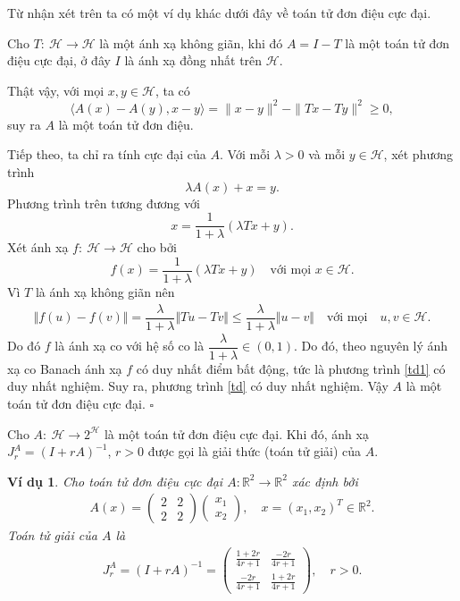 \documentclass[14pt, oneside,A4paper]{book}
\theoremstyle{plain}
\newcommand{\eproof}{\hfill $\square$}
\newtheorem{vd}[theorem]{\bf Ví dụ}
\begin{document}
Từ nhận xét trên ta có một ví dụ khác dưới đây về toán tử đơn điệu cực đại.

\vd\rm Cho $T:\ \mathcal H\longrightarrow \mathcal H$ là một ánh xạ không giãn, khi đó $A=I-T$ là một toán tử đơn điệu cực đại, ở đây $I$ là ánh xạ đồng nhất trên $\mathcal H$.

Thật vậy, với mọi $x,y\in \mathcal H$, ta có
$$\langle A(x)-A(y), x-y\rangle =\|x-y\|^2-\|Tx-Ty\|^2\geq 0,$$
suy ra $A$ là một toán tử đơn điệu.

Tiếp theo, ta chỉ ra tính cực đại của $A$. Với mỗi $\lambda >0$ và mỗi $y\in \mathcal H$, xét phương trình 
\begin{equation}\label{td}
\lambda A(x) +x=y.
\end{equation}
Phương trình trên tương đương với
\begin{equation}\label{td1}
x=\dfrac{1}{1+\lambda} (\lambda Tx+y).
\end{equation}
Xét ánh xạ $f:\ \mathcal H\longrightarrow \mathcal H$ cho bởi
$$f(x)=\dfrac{1}{1+\lambda} (\lambda Tx+y)\quad \text{với mọi $x\in \mathcal H$.}$$
Vì $T$ là ánh xạ không giãn nên
\begin{align*}
\Vert f(u)-f(v)\Vert = \dfrac{\lambda }{1+\lambda} \Vert Tu - Tv \Vert \le \dfrac{\lambda }{1+\lambda} \Vert u-v\Vert \quad \text{với mọi} \quad u,v\in \mathcal H .
\end{align*}
Do đó $f$ là ánh xạ co với hệ số co là $\dfrac{\lambda}{1+\lambda}\in (0,1)$. Do đó, theo nguyên lý ánh xạ co Banach ánh xạ $f$ có duy nhất điểm bất động, tức là phương trình \eqref{td1} có duy nhất nghiệm. Suy ra, phương trình \eqref{td} có duy nhất nghiệm. Vậy $A$ là một toán tử đơn điệu cực đại.
\eproof

\rm Cho $A:\ \mathcal H\longrightarrow 2^{\mathcal H}$ là một toán tử đơn điệu cực đại. Khi đó, ánh xạ $J_r^A=(I+rA)^{-1}$, $r>0$ được gọi là giải thức (toán tử giải) của $A$.

\begin{vd} \rm Cho toán tử đơn điệu cực đại $A:\mathbb R^{2} \rightarrow \mathbb R^{2}$ xác định bởi
	\begin{align*}
	A(x)= \begin{pmatrix}
	2 & 2\\ 
	2 & 2
	\end{pmatrix}
	\begin{pmatrix}
	x_{1}\\x_{2} 
	\end{pmatrix}, \quad x=(x_{1},x_{2})^{T} \in \mathbb R^{2}.
	\end{align*}
	Toán tử giải của $A$ là 
	\begin{align*}
	J_{r}^{A}=(I+rA)^{-1}=\begin{pmatrix}
	\frac{1+2r}{4r+1} & \frac{-2r}{4r+1}\\ 
	\frac{-2r}{4r+1} & \frac{1+2r}{4r+1}
	\end{pmatrix}, \quad r>0.
	\end{align*}
\end{vd}
\end{document}
